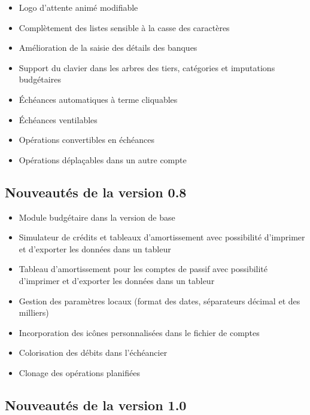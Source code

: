 \begin{itemize}
	\item Logo d'attente animé modifiable
	\item Complètement des listes sensible à la casse des caractères
	\item Amélioration de la saisie des détails des banques
	\item Support du clavier dans les arbres des tiers, catégories et imputations
	budgétaires
	\item Échéances automatiques à terme cliquables
	\item Échéances ventilables
	\item Opérations convertibles en échéances
	\item Opérations déplaçables dans un autre compte
\end{itemize}


\subsection{Nouveautés de la version 0.8}

\begin{itemize}
	\item Module budgétaire dans la version de base
	\item Simulateur de crédits et tableaux d'amortissement avec possibilité d'imprimer et d'exporter les données dans un tableur
	\item Tableau d'amortissement pour les comptes de passif avec possibilité d'imprimer et d'exporter les données dans un tableur
	\item Gestion des paramètres locaux (format des dates, séparateurs décimal et des milliers)
	\item Incorporation des icônes personnalisées dans le fichier de comptes
	\item Colorisation des débits dans l'échéancier
	\item Clonage des opérations planifiées
\end{itemize}


\subsection{Nouveautés de la version 1.0}

